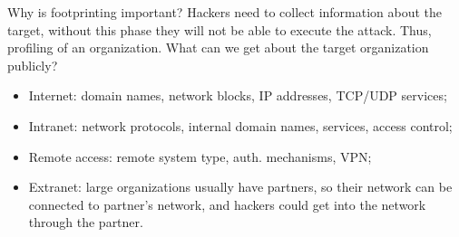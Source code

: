 Why is footprinting important? Hackers need to collect 
information about the target, without this phase they
will not be able to execute the attack. 
Thus, profiling 
of an organization. What can we get about the target 
organization publicly? 
\begin{itemize}
    \item Internet: domain names, network blocks, IP
    addresses, TCP/UDP services;
    \item Intranet: network protocols, internal domain names,
    services, access control;
    \item Remote access: remote system type, auth. mechanisms, 
    VPN;
    \item Extranet: large organizations usually have partners, 
    so their network can be connected to partner's 
    network, and hackers could get into the network 
    through the partner.
\end{itemize}

